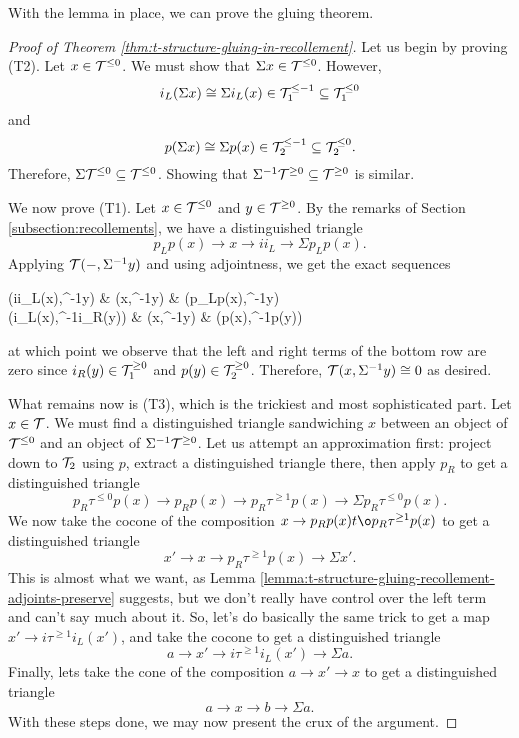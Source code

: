 With the lemma in place, we can prove the gluing theorem.

\begin{proof}[Proof of Theorem \ref{thm:t-structure-gluing-in-recollement}]
Let us begin by proving (T2). Let \(x\in\mathcal{T}^{\leq 0}\). We must show that \(\Sigma x \in\mathcal{T}^{\leq 0}\). However,
\[ i_L(\Sigma x) \cong \Sigma i_L(x) \in \mathcal{T}_1^{\leq -1} \subseteq \mathcal{T}_1^{\leq 0} \]
and
\[ p(\Sigma x) \cong \Sigma p(x) \in \mathcal{T}_2^{\leq -1} \subseteq \mathcal{T}_2^{\leq 0}. \]
Therefore, \(\Sigma\mathcal{T}^{\leq 0}\subseteq\mathcal{T}^{\leq 0}\). Showing that \(\Sigma^{-1}\mathcal{T}^{\geq 0}\subseteq\mathcal{T}^{\geq 0}\) is similar.

We now prove (T1). Let \(x\in\mathcal{T}^{\leq 0}\) and \(y\in\mathcal{T}^{\geq 0}\). By the remarks of Section \ref{subsection:recollements}, we have a distinguished triangle
\[ p_Lp(x) \to x \to ii_L \to \Sigma p_Lp(x). \]
Applying \(\mathcal{T}(-,\Sigma^{-1}y)\) and using adjointness, we get the exact sequences
\begin{diagram*}[cramped]
	\calT(ii_L(x),\Sigma^{-1}y)  \ar[r] & \calT(x,\Sigma^{-1}y) \ar[d,equal] \ar[r] & \calT(p_Lp(x),\Sigma^{-1}y)  \\
	\calT(i_L(x),\Sigma^{-1}i_R(y)) \ar[r] & \calT(x,\Sigma^{-1}y) \ar[r] & \calT(p(x),\Sigma^{-1}p(y))
\end{diagram*}
at which point we observe that the left and right terms of the bottom row are zero since \(i_R(y)\in\mathcal{T}_1^{\geq 0}\) and \(p(y)\in\mathcal{T}_2^{\geq 0}\). Therefore,
\(\mathcal{T}(x,\Sigma^{-1}y)\cong 0\) as desired.

What remains now is (T3), which is the trickiest and most sophisticated part. Let \(x\in\mathcal{T}\). We must find a distinguished triangle sandwiching \(x\)
between an object of \(\mathcal{T}^{\leq 0}\) and an object of \(\Sigma^{-1}\mathcal{T}^{\geq 0}\). Let us attempt an approximation first: project down to \(\mathcal{T}_2\) using \(p\),
extract a distinguished triangle there, then apply \(p_R\) to get a distinguished triangle
\[ p_R\tau^{\leq 0}p(x) \to p_Rp(x) \to p_R\tau^{\geq 1}p(x) \to \Sigma p_R\tau^{\leq 0}p(x). \]
We now take the cocone of the composition \(x \to p_Rp(x) t\o p_R\tau^{\geq 1}p(x)\) to get a distinguished triangle
\[ x' \to x \to p_R\tau^{\geq 1}p(x) \to \Sigma x'. \]
This is almost what we want, as Lemma \ref{lemma:t-structure-gluing-recollement-adjoints-preserve} suggests, but we don't really have control over the left term and can't say much about it. So, let's do basically the same trick
to get a map \(x' \to i\tau^{\geq 1}i_L(x')\), and take the cocone to get a distinguished triangle
\[ a \to x' \to i\tau^{\geq 1}i_L(x') \to \Sigma a. \]
Finally, lets take the cone of the composition \(a \to x' \to x\) to get a distinguished triangle
\[ a \to x \to b \to \Sigma a. \]
With these steps done, we may now present the crux of the argument.


\end{proof}
